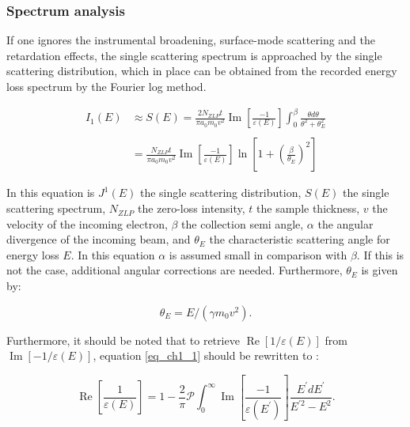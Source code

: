 \subsubsection{Spectrum analysis}
If one ignores the instrumental broadening, surface-mode scattering and the retardation effects, the single scattering spectrum is approached by the single scattering distribution, which in place can be obtained from the recorded energy loss spectrum by the Fourier log method. \cite{egerton_book}

\begin{equation}\label{eq_S_E}
\begin{aligned}
I_{1}(E) & \approx S(E)=\frac{2 N_{ZLP} t}{\pi a_{0} m_{0} v^{2}} \operatorname{Im}\left[\frac{-1}{\varepsilon(E)}\right] \int_{0}^{\beta} \frac{\theta d \theta}{\theta^{2}+\theta_{E}^{2}} \\
\\
&=\frac{N_{ZLP} t}{\pi a_{0} m_{0} v^{2}} \operatorname{Im}\left[\frac{-1}{\varepsilon(E)}\right] \ln \left[1+\left(\frac{\beta}{\theta_{E}}\right)^{2}\right]
\end{aligned}
\end{equation}

In this equation is $J^1(E)$ the single scattering distribution, $S(E)$ the single scattering spectrum, $N_{ZLP}$ the zero-loss intensity, $t$ the sample thickness, $v$ the velocity of the incoming electron, $\beta$ the collection semi angle, $\alpha$ the angular divergence of the incoming beam, and $\theta_E$ the characteristic scattering angle for energy loss $E$. In this equation $\alpha$ is assumed small in comparison with $\beta$. If this is not the case, additional angular corrections are needed. Furthermore, $\theta_E$ is given by:

\begin{equation} \label{eq_th_E}
    \theta_E = E/(\gamma m_0v^2) .
\end{equation}


Furthermore, it should be noted that to retrieve $\operatorname{Re}\left[1/\varepsilon(E)\right]$ from $\operatorname{Im}\left[-1/\varepsilon(E)\right]$, equation \eqref{eq_ch1_1} should be rewritten to \cite{Dapor2017}:

\begin{equation}\label{eq_kkr_eps}
    \operatorname{Re}\left[\frac{1}{\varepsilon(E)}\right]=1-\frac{2}{\pi} \mathcal{P} \int_{0}^{\infty} \operatorname{Im}\left[\frac{-1}{\varepsilon\left(E^{\prime}\right)}\right] \frac{E^{\prime} d E^{\prime}}{E^{\prime 2}-E^{2}}.
\end{equation}




